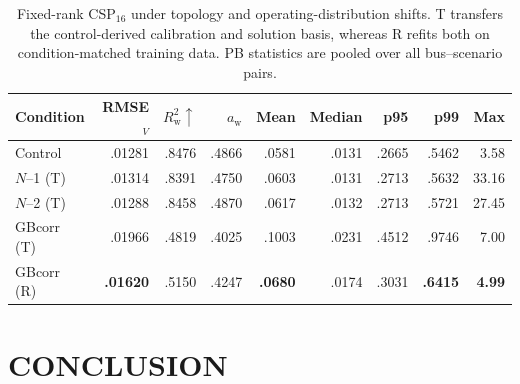 \documentclass{article}
\begin{document}


\begin{table}[t]
\centering
\caption{
Fixed-rank CSP$_{16}$ under topology and operating-distribution shifts.
T transfers the control-derived calibration and solution basis, whereas R
refits both on condition-matched training data. PB statistics are pooled
over all bus--scenario pairs.
}
\label{tab:shift}
\setlength{\tabcolsep}{1.8pt}
\footnotesize
\begin{tabular}{lrrrrrrrr}
\toprule
Condition &
RMSE$_V$ &
$R_{\mathrm{w}}^2 \uparrow$ &
$a_{\mathrm{w}}$ &
Mean &
Median &
p95 &
p99 &
Max \\
\midrule
Control
& .01281
& .8476
& .4866
& .0581
& .0131
& .2665
& .5462
& 3.58 \\
\midrule
$N$--1 (T)
& .01314
& .8391
& .4750
& .0603
& .0131
& .2713
& .5632
& 33.16 \\
$N$--2 (T)
& .01288
& .8458
& .4870
& .0617
& .0132
& .2713
& .5721
& 27.45 \\
\midrule
GBcorr (T)
& .01966
& .4819
& .4025
& .1003
& .0231
& .4512
& .9746
& 7.00 \\
GBcorr (R)
& \textbf{.01620}
& .5150
& .4247
& \textbf{.0680}
& .0174
& .3031
& \textbf{.6415}
& \textbf{4.99} \\
\bottomrule
\end{tabular}

\end{table}

\section{CONCLUSION}
\end{document}
